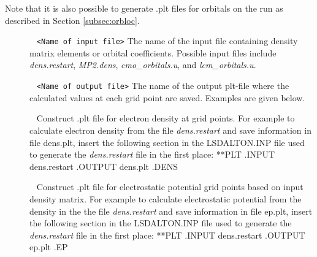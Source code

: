 Note that it is also possible to generate .plt files for orbitals on the run as described in Section \ref{subsec:orbloc}.

\begin{description}
\item[] \verb| | \newline
\verb|<Name of input file>| \newline
The name of the input file containing density matrix elements or orbital coefficients. Possible input files include \emph{dens.restart}, \emph{MP2.dens}, \emph{cmo\_orbitals.u}, and \emph{lcm\_orbitals.u}.

\item[] \verb| | \newline
\verb|<Name of output file>| \newline
The name of the output plt-file where the calculated values at each grid point are saved. Examples are given below.

\item[]\verb| | \newline
Construct .plt file for electron density at grid points.
For example to calculate electron density from the file  \emph{dens.restart} and save information in file  dens.plt,
insert the following section in the LSDALTON.INP file used to generate the  \emph{dens.restart} file in the first place:
 \newline
**PLT \newline
.INPUT \newline
dens.restart \newline
.OUTPUT \newline
dens.plt \newline
.DENS \newline

\item[]\verb| | \newline
Construct .plt file for electrostatic potential grid points based on input density matrix.
For example to calculate electrostatic potential from the density in the the file  \emph{dens.restart} and save information in file  ep.plt,
insert the following section in the LSDALTON.INP file used to generate the  \emph{dens.restart} file in the first place:
 \newline
**PLT \newline
.INPUT \newline
dens.restart \newline
.OUTPUT \newline
ep.plt \newline
.EP \newline



\end{description}
